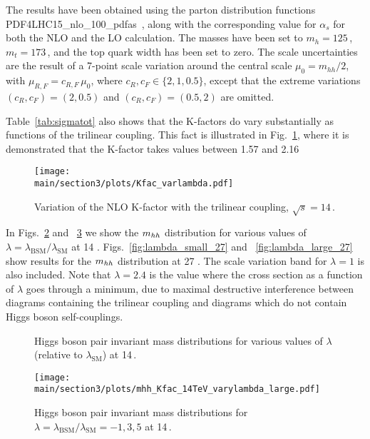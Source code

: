 The results have been obtained using the parton distribution functions PDF4LHC15\_nlo\_100\_pdfas~\cite{Butterworth:2015oua,CT14,MMHT14,Ball:2014uwa},
along with the corresponding value for $\alpha_s$ for both the NLO and
the LO calculation.
The masses have been set to $m_h=125$\,\UGeV, $m_t=173$\,\UGeV,
and the top quark width has been set to zero. 
The scale uncertainties are the result of a 7-point scale variation around the central scale $\mu_0 = m_{hh}/2$,
with $\mu_{R,F}=c_{R,F}\,\mu_0$, where 
$c_R,c_F\in \{2,1,0.5\}$, except that the extreme variations $(c_R,c_F)=(2,0.5)$ and $(c_R,c_F)=(0.5,2)$
are omitted. 

Table~\ref{tab:sigmatot} also shows that the K-factors do vary substantially as functions of the trilinear coupling.
This fact is illustrated in Fig.~\ref{fig:Kfacvariation}, where it is demonstrated that the K-factor takes values between 1.57 and 2.16

\begin{figure}[htb]
  \centering
    \texttt{[image: \\main/section3/plots/Kfac\_varlambda.pdf]}
\caption{Variation of the NLO K-factor with the trilinear coupling, $\sqrt{s}=14$\,\UTeV.}
\label{fig:Kfacvariation}
\end{figure}



In Figs.~\ref{fig:lambda_small} and ~\ref{fig:lambda_large} we show the $m_{hh}$ distribution for various values of $\lambda=\lambda_{\mathrm{BSM}}/\lambda_{\mathrm{SM}}$ at 14 \UTeV.
Figs.~\ref{fig:lambda_small_27} and ~\ref{fig:lambda_large_27} 
 show results for the $m_{hh}$ distribution at 27 \UTeV. The scale variation band for $\lambda=1$ is also included.
 Note that $\lambda=2.4$ is the value where the cross section as a function of $\lambda$ goes through a minimum, due to maximal destructive interference between diagrams containing the trilinear coupling and diagrams which do not contain Higgs boson self-couplings.
 
\begin{figure}[htb]
  \centering
 \caption{Higgs boson pair invariant mass distributions for various values of $\lambda$ (relative to $\lambda_{\mathrm{SM}}$)  at 14\,\UTeV.}
\label{fig:lambda_small}
\end{figure}
%
\begin{figure}[htb]
  \centering
    \texttt{[image: \\main/section3/plots/mhh\_Kfac\_14TeV\_varylambda\_large.pdf]}
\caption{Higgs boson pair invariant mass distributions for $\lambda=\lambda_{\mathrm{BSM}}/\lambda_{\mathrm{SM}}=-1,3,5$  at 14\,\UTeV.}
\label{fig:lambda_large}
\end{figure}


